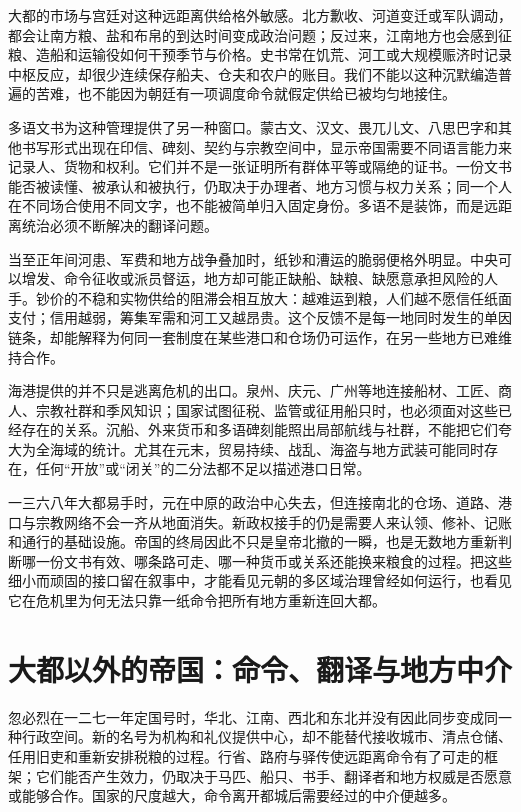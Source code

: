 大都的市场与宫廷对这种远距离供给格外敏感。北方歉收、河道变迁或军队调动，都会让南方粮、盐和布帛的到达时间变成政治问题；反过来，江南地方也会感到征粮、造船和运输役如何干预季节与价格。史书常在饥荒、河工或大规模赈济时记录中枢反应，却很少连续保存船夫、仓夫和农户的账目。我们不能以这种沉默编造普遍的苦难，也不能因为朝廷有一项调度命令就假定供给已被均匀地接住。

多语文书为这种管理提供了另一种窗口。蒙古文、汉文、畏兀儿文、八思巴字和其他书写形式出现在印信、碑刻、契约与宗教空间中，显示帝国需要不同语言能力来记录人、货物和权利。它们并不是一张证明所有群体平等或隔绝的证书。一份文书能否被读懂、被承认和被执行，仍取决于办理者、地方习惯与权力关系；同一个人在不同场合使用不同文字，也不能被简单归入固定身份。多语不是装饰，而是远距离统治必须不断解决的翻译问题。

当至正年间河患、军费和地方战争叠加时，纸钞和漕运的脆弱便格外明显。中央可以增发、命令征收或派员督运，地方却可能正缺船、缺粮、缺愿意承担风险的人手。钞价的不稳和实物供给的阻滞会相互放大：越难运到粮，人们越不愿信任纸面支付；信用越弱，筹集军需和河工又越昂贵。这个反馈不是每一地同时发生的单因链条，却能解释为何同一套制度在某些港口和仓场仍可运作，在另一些地方已难维持合作。

海港提供的并不只是逃离危机的出口。泉州、庆元、广州等地连接船材、工匠、商人、宗教社群和季风知识；国家试图征税、监管或征用船只时，也必须面对这些已经存在的关系。沉船、外来货币和多语碑刻能照出局部航线与社群，不能把它们夸大为全海域的统计。尤其在元末，贸易持续、战乱、海盗与地方武装可能同时存在，任何“开放”或“闭关”的二分法都不足以描述港口日常。

一三六八年大都易手时，元在中原的政治中心失去，但连接南北的仓场、道路、港口与宗教网络不会一齐从地面消失。新政权接手的仍是需要人来认领、修补、记账和通行的基础设施。帝国的终局因此不只是皇帝北撤的一瞬，也是无数地方重新判断哪一份文书有效、哪条路可走、哪一种货币或关系还能换来粮食的过程。把这些细小而顽固的接口留在叙事中，才能看见元朝的多区域治理曾经如何运行，也看见它在危机里为何无法只靠一纸命令把所有地方重新连回大都。

\section{大都以外的帝国：命令、翻译与地方中介}

忽必烈在一二七一年定国号时，华北、江南、西北和东北并没有因此同步变成同一种行政空间。新的名号为机构和礼仪提供中心，却不能替代接收城市、清点仓储、任用旧吏和重新安排税粮的过程。行省、路府与驿传使远距离命令有了可走的框架；它们能否产生效力，仍取决于马匹、船只、书手、翻译者和地方权威是否愿意或能够合作。国家的尺度越大，命令离开都城后需要经过的中介便越多。

